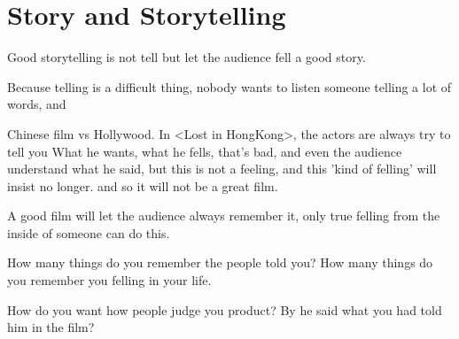 \chapter{Story and Storytelling}

Good storytelling is not tell but let the audience fell a good story.

Because telling is a difficult thing, nobody wants to listen someone telling a lot of words, and 

Chinese film vs Hollywood.
In <Lost in HongKong>, the actors are always try to tell you What he wants, what he fells, that's bad, and even the audience understand what he said, but this is not a feeling, and this 'kind of felling' will insist no longer. and so it will not be a great film.

A good film will let the audience always remember it, only true felling from the inside of someone can do this.

How many things do you remember the people told you? How many things do you remember you felling in your life.  

How do you want how people judge you product? By he said what you had told him in the film?  